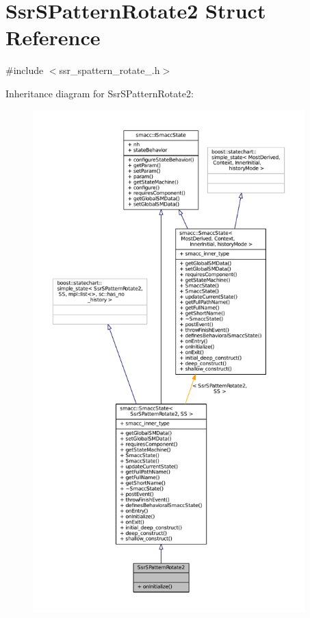 \hypertarget{structSsrSPatternRotate2}{}\section{Ssr\+S\+Pattern\+Rotate2 Struct Reference}
\label{structSsrSPatternRotate2}


{\ttfamily \#include $<$ssr\+\_\+spattern\+\_\+rotate\+\_.\+h$>$}



Inheritance diagram for Ssr\+S\+Pattern\+Rotate2\+:
\nopagebreak
\begin{figure}[H]
\begin{center}
\leavevmode
\includegraphics[height=550pt]{structSsrSPatternRotate2__inherit__graph}
\end{center}
\end{figure}


